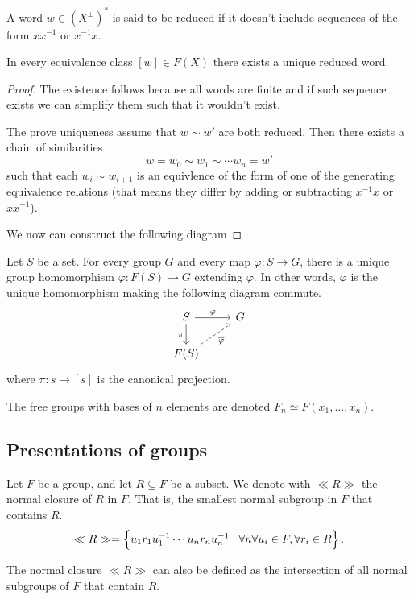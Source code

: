 \documentclass[11pt,a4paper]{article}
\begin{document}
\begin{definition}
  A word $w \in (X^{\pm})^*$ is said to be reduced if it doesn't include
  sequences of the form $x x^{-1}$ or $x^{-1} x$.
\end{definition}

\begin{lemma}
  In every equivalence class $[w] \in F(X)$ there exists a unique reduced
  word.
\end{lemma}
\begin{proof}
  The existence follows because all words are finite and if such sequence
  exists we can simplify them such that it wouldn't exist.

  The prove uniqueness assume that $w \sim w'$ are both reduced.
  Then there exists a chain of similarities
  \[
    w = w_0 \sim w_1 \sim \cdots w_n = w'
  \]
  such that each $w_{i} \sim w_{i+1}$ is an equivlence of the form of one
  of the generating equivalence relations (that means they differ by
  adding or subtracting $x^{-1} x$ or $x x^{-1}$).

  We now can construct the following diagram
\end{proof}
\begin{theorem}
  Let $S$ be a set.
  For every group $G$ and every map $\varphi \colon S \to G$,
  there is a unique group homomorphism
  $\overline \varphi \colon F(S) \to G$ extending $\varphi$.
  In other words, $\overline \varphi$ is the unique homomorphism
  making the following diagram commute.
  \[
    \begin{tikzcd}
    S \arrow[r, "\varphi"] \arrow[d, "\pi"']      & G \\
    F(S) \arrow[ru, "\overline \varphi"', dashed] &  
    \end{tikzcd}
  \]
  where $\pi \colon s \mapsto [s]$ is the canonical projection.
\end{theorem}

\begin{remark}
  The free groups with bases of $n$ elements are denoted
  $F_n \simeq F(x_1, \dots, x_n)$.
\end{remark}

\subsection{Presentations of groups}
\begin{definition}
  Let $F$ be a group, and let $R \subseteq F$ be a subset.
  We denote with $\ll R \gg$ the normal closure of $R$ in $F$.
  That is, the smallest normal subgroup in $F$ that contains $R$.
  \[
    \ll R \gg =
    \left\{u_1 r_1 u_1^{-1} \cdots u_n r_n u_n^{-1} \mid
      \forall n \forall u_i \in F, \forall r_i \in R\right\}.
  \]
\end{definition}
\begin{remark}
  The normal closure $\ll R \gg$ can also be defined as the intersection of all
  normal subgroups of $F$ that contain $R$.
\end{remark}
\end{document}
